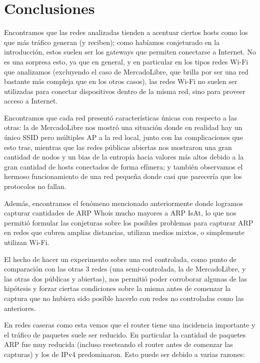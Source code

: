 \documentclass{article}
\theoremstyle{definition}
\theoremstyle{remark}
\begin{document}
\section{Conclusiones}

Encontramos que las redes analizadas tienden a acentuar ciertos hosts como los que más tráfico generan (y reciben); como habíamos conjeturado en la introducción, estos suelen ser los gateways que permiten conectarse a Internet. No es una sorpresa esto, ya que en general, y en particular en los tipos redes Wi-Fi que analizamos (excluyendo el caso de MercadoLibre, que brilla por ser una red bastante más compleja que en los otros casos), las redes Wi-Fi no suelen ser utilizadas para conectar dispositivos dentro de la misma red, sino para proveer acceso a Internet.

Encontramos que cada red presentó características únicas con respecto a las otras: la de MercadoLibre nos mostró una situación donde en realidad hay un único SSID pero múltiples AP a la red local, junto con las complicaciones que esto trae, mientras que las redes públicas abiertas nos mostraron una gran cantidad de nodos y un bias de la entropía hacia valores más altos debido a la gran cantidad de hosts conectados de forma efímera; y también observamos el hermoso funcionamiento de una red pequeña donde casi que parecería que los protocolos no fallan.

Además, encontramos el fenómeno mencionado anteriormente donde logramos capturar cantidades de ARP Whois mucho mayores a ARP IsAt, lo que nos permitió formular las conjeturas sobre los posibles problemas para capturar ARP en redes que cubren amplias distancias, utilizan medios mixtos, o simplemente utilizan Wi-Fi.

El hecho de hacer un experimento sobre una red controlada, como punto de comparación con las otras 3 redes (una semi-controlada, la de MercadoLibre, y las otras dos públicas y abiertas), nos permitió poder corroborar algunas de las hipótesis y forzar ciertas condiciones sobre la misma antes de comenzar la captura que no hubiera sido posible hacerlo con redes no controladas como las anteriores.

En redes caseras como esta vemos que el router tiene una incidencia importante y el tráfico de paquetes suele ser reducido. En particular la cantidad de paquetes ARP fue muy reducida (incluso reseteando el router antes de comenzar las capturas) y los de IPv4 predominaron. Esto puede ser debido a varias razones:
\end{document}
